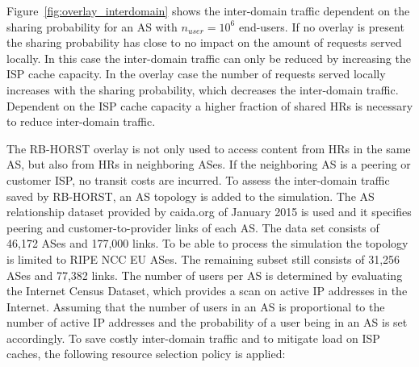 
Figure~\ref{fig:overlay_interdomain} shows the inter-domain traffic dependent on the sharing probability for an AS with $n_{user}=10^6$ end-users. If no overlay is present the sharing probability has close to no impact on the amount of requests served locally. In this case the inter-domain traffic can only be reduced by increasing the ISP cache capacity. In the overlay case the number of requests served locally increases with the sharing probability, which decreases the inter-domain traffic. Dependent on the ISP cache capacity a higher fraction of shared HRs is necessary to reduce inter-domain traffic.


The RB-HORST overlay is not only used to access content from HRs in the same AS, but also from HRs in neighboring ASes. If the neighboring AS is a peering or customer ISP, no transit costs are incurred.
To assess the inter-domain traffic saved by RB-HORST, an AS topology is added to the simulation. The AS relationship dataset provided by caida.org\cite{caida2015} of January 2015 is used and it specifies peering and customer-to-provider links of each AS. The data set consists of 46,172 ASes and 177,000 links.
To be able to process the simulation the topology is limited to RIPE NCC EU ASes. The remaining subset still consists of 31,256 ASes and 77,382 links.
The number of users per AS is determined by evaluating the Internet Census Dataset\cite{carna2013}, which provides a scan on active IP addresses in the Internet. Assuming that the number of users in an AS is proportional to the number of active IP addresses and the probability of a user being in an AS is set accordingly.
To save costly inter-domain traffic and to mitigate load on ISP caches, the following resource selection policy is applied:

